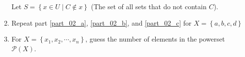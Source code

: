 \documentclass{article}
\begin{document}
\begin{enumerate}[label = \textbf{\alph*)}]
		Let $ S = \left\{ x \in U \mid C \notin x \right\} $ (The set of all sets that do not contain $ C $).
	\item Repeat part \ref{part_02_a}, \ref{part_02_b}, and \ref{part_02_c} for $ X = \left\{ a, b, c, d \right\} $
	\item For $ X = \left\{ x_1, x_2, \cdots, x_n \right\} $, guess the number of elements in the powerset $ \mathcal{P}(X) $.
\end{enumerate}
\end{document}

